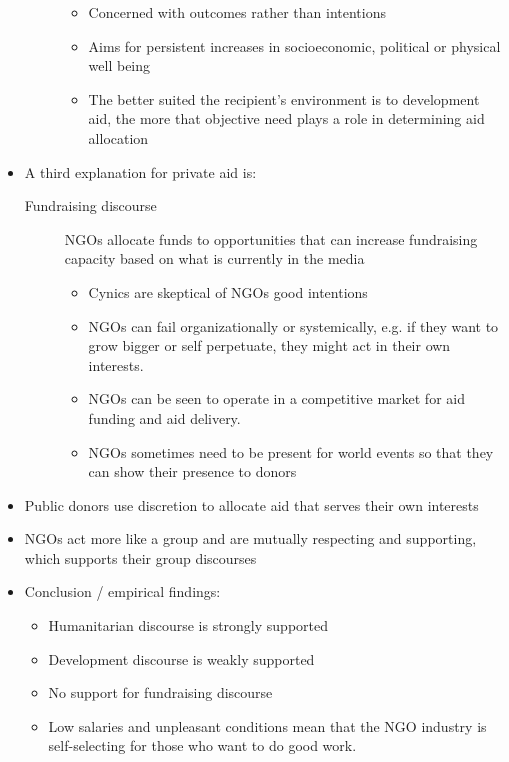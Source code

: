 \documentclass[11pt]{article}
\begin{document}
\begin{itemize}
\begin{description}
\begin{itemize}
\item Concerned with outcomes rather than intentions
\item Aims for persistent increases in socioeconomic, political or physical
well being
\item The better suited the recipient's environment is to development aid, the
more that objective need plays a role in determining aid allocation
\end{itemize}
\end{description}
\item A third explanation for private aid is:
\begin{description}
\item[{Fundraising discourse}] NGOs allocate funds to opportunities that can
increase fundraising capacity based on what is currently in the media
\begin{itemize}
\item Cynics are skeptical of NGOs good intentions
\item NGOs can fail organizationally or systemically, e.g. if they want to grow
bigger or self perpetuate, they might act in their own interests.
\item NGOs can be seen to operate in a competitive market for aid funding and
aid delivery.
\item NGOs sometimes need to be present for world events so that they can show
their presence to donors
\end{itemize}
\end{description}
\item Public donors use discretion to allocate aid that serves their own interests
\item NGOs act more like a group and are mutually respecting and supporting, which
supports their group discourses
\item Conclusion / empirical findings:
\begin{itemize}
\item Humanitarian discourse is strongly supported
\item Development discourse is weakly supported
\item No support for fundraising discourse
\item Low salaries and unpleasant conditions mean that the NGO industry is
self-selecting for those who want to do good work.
\end{itemize}
\end{itemize}
\end{document}
